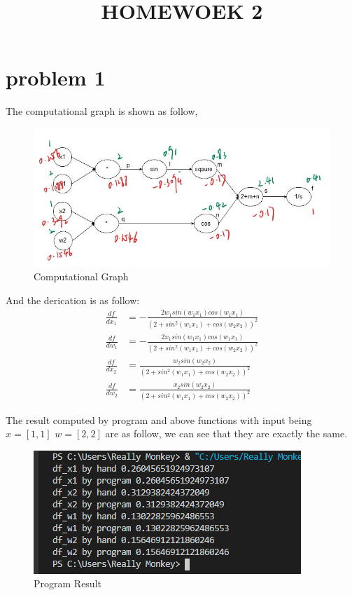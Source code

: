 \documentclass[conference]{IEEEtran}
\begin{document}
\title{HOMEWOEK 2}

\author{
}

\maketitle

\section*{problem 1}
The computational graph is shown as follow,
\begin{figure}[H]
    \centerline{\includegraphics[scale=0.4]{pic1.jpg}}
    \caption{Computational Graph}
\end{figure}

And the derication is as follow:
\[\begin{aligned}
    \frac{df}{dx_1} &= -\frac{2w_1sin(w_1x_1)cos(w_1x_1)}{(2+sin^2(w_1x_1)+cos(w_2x_2))^2}\\
    \frac{df}{dw_1} &= -\frac{2x_1sin(w_1x_1)cos(w_1x_1)}{(2+sin^2(w_1x_1)+cos(w_2x_2))^2}\\
    \frac{df}{dx_2} &= \frac{w_2sin(w_2x_2)}{(2+sin^2(w_1x_1)+cos(w_2x_2))^2}\\
    \frac{df}{dw_2} &= \frac{x_2sin(w_2x_2)}{(2+sin^2(w_1x_1)+cos(w_2x_2))^2}
\end{aligned}\]

The result computed by program and above functions with input being $x=[1,1]$ $w=[2,2]$ are as follow, we can see that they are 
exactly the same.

\begin{figure}[H]
    \centerline{\includegraphics[scale=0.8]{pic2.png}}
    \caption{Program Result}
\end{figure}
\end{document}
